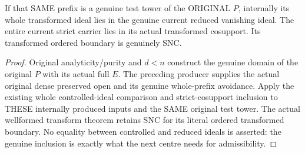 \begin{lemma}
\label{hir:actual-singular-prefix-original-controlled-comparison}
\leanok
If that SAME prefix is a genuine test tower of the ORIGINAL $P$, internally
its whole transformed ideal lies in the genuine current reduced vanishing
ideal. The entire current strict carrier lies in its actual transformed
cosupport. Its transformed ordered boundary is genuinely SNC.
\end{lemma}
\begin{proof}
Original analyticity/purity and $d<n$ construct the genuine domain of the
original $P$ with its actual full $E$. The preceding producer supplies the
actual original dense preserved open and its genuine whole-prefix avoidance.
Apply the existing whole controlled-ideal comparison and strict-cosupport
inclusion to THESE internally produced inputs and the SAME original test
tower. The actual wellformed transform theorem retains SNC for its literal
ordered transformed boundary. No equality between controlled and reduced
ideals is asserted: the genuine inclusion is exactly what the next centre
needs for admissibility.
\end{proof}

